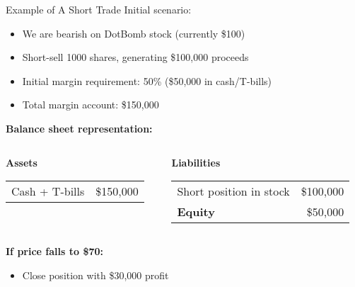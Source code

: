 \documentclass[10pt]{beamer}
\begin{document}
\begin{frame}{Example of A Short Trade}
  Initial scenario:
  \begin{itemize}
    \item We are bearish on DotBomb stock (currently \$100)
    \item Short-sell 1000 shares, generating \$100,000 proceeds
    \item Initial margin requirement: 50\% (\$50,000 in cash/T-bills)
    \item Total margin account: \$150,000
  \end{itemize}
  
  \pause
  \textbf{Balance sheet representation:}
  \begin{columns}
    \begin{column}{0.48\textwidth}
      \textbf{Assets} \vspace{0.2em}\\
      \begin{tabular}{lr}
        Cash + T-bills & \$150,000 \\
      \end{tabular}
    \end{column}
    \begin{column}{0.48\textwidth}
      \textbf{Liabilities} \vspace{0.2em}\\
      \begin{tabular}{lr}
        Short position in stock & \$100,000 \\[0.5em]
        \textbf{Equity} & \$50,000 \\
      \end{tabular}
    \end{column}
  \end{columns}
  
  \pause
  \textbf{If price falls to \$70:}
  \begin{itemize}
    \item Close position with \$30,000 profit
  \end{itemize}
  

\end{frame}
\end{document}
